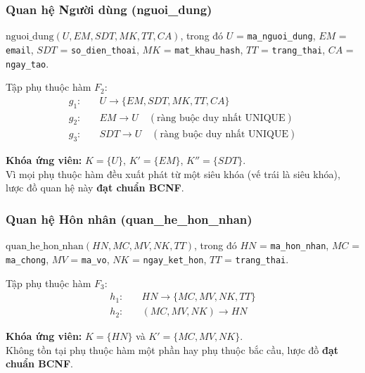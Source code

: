 \subsubsection{Quan hệ Người dùng (nguoi\_dung)}

\begin{example}
$\text{nguoi\_dung}(U, EM, SDT, MK, TT, CA)$, trong đó $U$ = \texttt{ma\_nguoi\_dung}, $EM$ = \texttt{email}, $SDT$ = \texttt{so\_dien\_thoai}, $MK$ = \texttt{mat\_khau\_hash}, $TT$ = \texttt{trang\_thai}, $CA$ = \texttt{ngay\_tao}.

Tập phụ thuộc hàm $F_2$:
\begin{align*}
    g_1: & \quad U \rightarrow \{EM, SDT, MK, TT, CA\} \\
    g_2: & \quad EM \rightarrow U \quad (\text{ràng buộc duy nhất UNIQUE}) \\
    g_3: & \quad SDT \rightarrow U \quad (\text{ràng buộc duy nhất UNIQUE})
\end{align*}

\textbf{Khóa ứng viên:} $K = \{U\}$, $K' = \{EM\}$, $K'' = \{SDT\}$. \\
Vì mọi phụ thuộc hàm đều xuất phát từ một siêu khóa (vế trái là siêu khóa), lược đồ quan hệ này \textbf{đạt chuẩn BCNF}.
\end{example}

\subsubsection{Quan hệ Hôn nhân (quan\_he\_hon\_nhan)}

\begin{example}
$\text{quan\_he\_hon\_nhan}(HN, MC, MV, NK, TT)$, trong đó $HN$ = \texttt{ma\_hon\_nhan}, $MC$ = \texttt{ma\_chong}, $MV$ = \texttt{ma\_vo}, $NK$ = \texttt{ngay\_ket\_hon}, $TT$ = \texttt{trang\_thai}.

Tập phụ thuộc hàm $F_3$:
\begin{align*}
    h_1: & \quad HN \rightarrow \{MC, MV, NK, TT\} \\
    h_2: & \quad (MC, MV, NK) \rightarrow HN
\end{align*}

\textbf{Khóa ứng viên:} $K = \{HN\}$ và $K' = \{MC, MV, NK\}$. \\
Không tồn tại phụ thuộc hàm một phần hay phụ thuộc bắc cầu, lược đồ \textbf{đạt chuẩn BCNF}.
\end{example}

